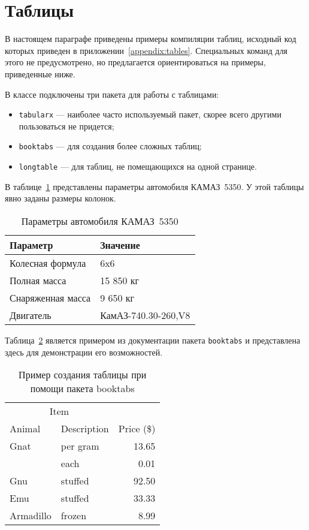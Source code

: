 \section{Таблицы}

В настоящем параграфе приведены примеры компиляции таблиц, исходный код которых
приведен в приложении~\ref{appendix:tables}. Специальных команд для
этого не предусмотрено, но предлагается ориентироваться на примеры, приведенные
ниже.

В классе подключены три пакета для работы с таблицами:
\begin{itemize}
    \item \lstinline$tabularx$ --- наиболее часто используемый пакет, скорее
    всего другими пользоваться не придется;
    \item \lstinline$booktabs$ --- для создания более сложных таблиц;
    \item \lstinline$longtable$ --- для таблиц, не помещающихся на одной
    странице. 
\end{itemize}

В таблице~\ref{table:KAMAZ_5350_params} представлены параметры автомобиля
КАМАЗ~5350. У этой таблицы явно заданы размеры колонок. 

\begin{table}[h]
    \centering
    \caption{Параметры автомобиля КАМАЗ~5350}
 	\label{table:KAMAZ_5350_params}
    \begin{tabular}{|p{8cm}|p{8cm}|}                \hline 
		\textbf{Параметр}   & \textbf{Значение}     \\\hline
		Колесная формула    & 6x6                   \\\hline
		Полная масса        & 15 850 кг             \\\hline
		Снаряженная масса   & 9 650 кг              \\\hline
		Двигатель           & КамАЗ-740.30-260,V8   \\\hline
	\end{tabular}
\end{table}

Таблица~\ref{table:booktabs} является примером из документации пакета
\lstinline:booktabs: и представлена здесь для демонстрации его возможностей.

\begin{table}[htb]
	\caption{Пример создания таблицы при помощи пакета booktabs}
    \label{table:booktabs}
    \begin{tabular}{@{}llr@{}} \toprule
        \multicolumn{2}{c}{Item} \\ \cmidrule(r){1-2}
        Animal      & Description   & Price (\$)    \\ \midrule
        Gnat        & per gram      & 13.65         \\
                    & each          & 0.01          \\
        Gnu         & stuffed       & 92.50         \\
        Emu         & stuffed       & 33.33         \\
        Armadillo   & frozen        & 8.99          \\ \bottomrule
    \end{tabular}
\end{table}

